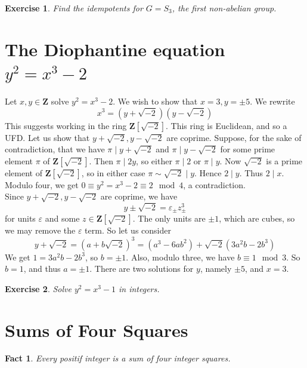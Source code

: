 \documentclass[12pt]{article}
\newtheorem*{fact*}{Fact}
\newtheorem*{exer*}{Exercise}
\newcommand{\eps}{\varepsilon}
\newcommand{\Z}{\mathbf{Z}}
\begin{document}
\begin{exer*}
Find the idempotents for $G=S_3$, the first non-abelian group.
\end{exer*}

\newpage
\section{The Diophantine equation \texorpdfstring{$y^2=x^3-2$}{}}

Let $x,y\in\Z$ solve $y^2=x^3-2$. We wish to show that $x=3,y=\pm5$. We rewrite 
\[
x^3 = (y+\sqrt{-2})(y-\sqrt{-2})\]
This suggests working in the ring $\Z[\sqrt{-2}]$. This ring is Euclidean, and so a UFD. Let us show that $y+\sqrt{-2},y-\sqrt{-2}$ are coprime. Suppose, for the sake of contradiction, that we have $\pi \mid y+\sqrt{-2}$ and $\pi \mid y-\sqrt{-2}$ for some prime element $\pi$ of $\Z[\sqrt{-2}]$. Then $\pi \mid 2y$, so either $\pi\mid 2$ or $\pi \mid y$. Now $\sqrt{-2}$ is a prime element of $\Z[\sqrt{-2}]$, so in either case $\pi\sim \sqrt{-2} \mid y$. Hence $2\mid y$. Thus $2\mid x$. Modulo four, we get $0\equiv y^2 = x^3 - 2 \equiv 2 \mod 4$, a contradiction. \\
Since $y+\sqrt{-2}, y-\sqrt{-2}$ are coprime, we have
\[y\pm \sqrt{-2} = \eps_{\pm} z_{\pm}^3\]
for units $\eps$ and some $z\in\Z[\sqrt{-2}]$. The only units are $\pm1$, which are cubes, so we may remove the $\eps$ term. So let us consider \[y+\sqrt{-2} = (a+b\sqrt{-2})^3 = (a^3-6ab^2) + \sqrt{-2}(3a^2b-2b^3)\]
We get $1=3a^2b-2b^3$, so $b=\pm 1$. Also, modulo three, we have $b\equiv 1 \mod 3$. So $b=1$, and thus $a=\pm1$. There are two solutions for $y$, namely $\pm 5$, and $x=3$.


\begin{exer*}
    Solve $y^2=x^3-1$ in integers.
\end{exer*}


\newpage
\section{Sums of Four Squares}

\begin{fact*}
Every positif integer is a sum of four integer squares.
\end{fact*}
\end{document}

